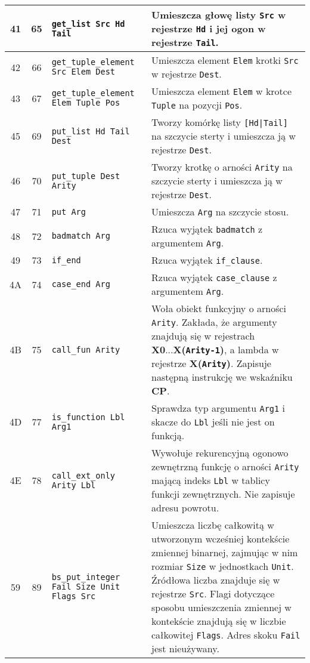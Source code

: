 \begin{longtable}{|c|c|p{5cm}|p{7cm}|}
\hline
41 & 65 & \texttt{get\_list Src Hd Tail} & Umieszcza głowę listy \texttt{Src} w rejestrze \texttt{Hd} i jej ogon w rejestrze \texttt{Tail}. \\
\hline
42 & 66 & \texttt{get\_tuple\_element Src Elem Dest} & Umieszcza element \texttt{Elem} krotki \texttt{Src} w rejestrze \texttt{Dest}.\\
\hline
43 & 67 & \texttt{get\_tuple\_element Elem Tuple Pos} & Umieszcza element \texttt{Elem} w krotce \texttt{Tuple} na pozycji \texttt{Pos}.\\
\hline
45 & 69 & \texttt{put\_list Hd Tail Dest} & Tworzy komórkę listy \texttt{[Hd|Tail]} na szczycie sterty i umieszcza ją w rejestrze \texttt{Dest}.\\
\hline
46 & 70 & \texttt{put\_tuple Dest Arity} & Tworzy krotkę o arności \texttt{Arity} na szczycie sterty i umieszcza ją w rejestrze \texttt{Dest}.\\
\hline
47 & 71 & \texttt{put Arg} & Umieszcza \texttt{Arg} na szczycie stosu.\\
\hline
48 & 72 & \texttt{badmatch Arg} & Rzuca wyjątek \texttt{badmatch} z argumentem \texttt{Arg}.\\
\hline
49 & 73 & \texttt{if\_end} & Rzuca wyjątek \texttt{if\_clause}.\\
\hline
4A & 74 & \texttt{case\_end Arg} & Rzuca wyjątek \texttt{case\_clause} z argumentem \texttt{Arg}.\\
\hline
4B & 75 & \texttt{call\_fun Arity} & Woła obiekt funkcyjny o arności \texttt{Arity}. Zakłada, że argumenty znajdują się w rejestrach \textbf{X0}...\textbf{X(\texttt{Arity-1})}, a lambda w rejestrze \textbf{X(\texttt{Arity})}. Zapisuje następną instrukcję we wskaźniku \textbf{CP}.\\
\hline
4D & 77 & \texttt{is\_function Lbl Arg1} & Sprawdza typ argumentu \texttt{Arg1} i skacze do \texttt{Lbl} jeśli nie jest on funkcją.\\
\hline
4E & 78 & \texttt{call\_ext\_only Arity Lbl} & Wywołuje rekurencyjną ogonowo zewnętrzną funkcję o arności \texttt{Arity} mającą indeks \texttt{Lbl} w tablicy funkcji zewnętrznych. Nie zapisuje adresu powrotu.\\
\hline
59 & 89 & \texttt{bs\_put\_integer Fail Size Unit Flags Src} & Umieszcza liczbę całkowitą w utworzonym wcześniej kontekście zmiennej binarnej, zajmując w nim rozmiar \texttt{Size} w jednostkach \texttt{Unit}. Źródłowa liczba znajduje się w rejestrze \texttt{Src}. Flagi dotyczące sposobu umieszczenia zmiennej w kontekście znajdują się w liczbie całkowitej \texttt{Flags}. Adres skoku \texttt{Fail} jest nieużywany. \\

\end{longtable}
